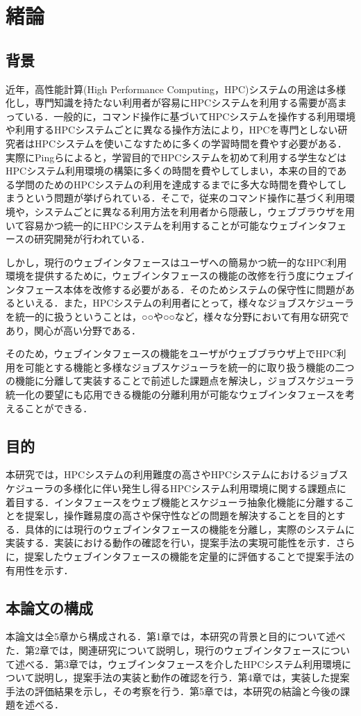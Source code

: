 
\section{緒論}
\subsection{背景}
近年，高性能計算(High Performance Computing，HPC)システムの用途は多様化し，専門知識を持たない利用者が容易にHPCシステムを利用する需要が高まっている．一般的に，コマンド操作に基づいてHPCシステムを操作する利用環境や利用するHPCシステムごとに異なる操作方法により，HPCを専門としない研究者はHPCシステムを使いこなすために多くの学習時間を費やす必要がある．実際にPingらによると，学習目的でHPCシステムを初めて利用する学生などはHPCシステム利用環境の構築に多くの時間を費やしてしまい，本来の目的である学問のためのHPCシステムの利用を達成するまでに多大な時間を費やしてしまうという問題が挙げられている．\cite{cite1}そこで，従来のコマンド操作に基づく利用環境や，システムごとに異なる利用方法を利用者から隠蔽し，ウェブブラウザを用いて容易かつ統一的にHPCシステムを利用することが可能なウェブインタフェースの研究開発が行われている．\par
しかし，現行のウェブインタフェースはユーザへの簡易かつ統一的なHPC利用環境を提供するために，ウェブインタフェースの機能の改修を行う度にウェブインタフェース本体を改修する必要がある．そのためシステムの保守性に問題があるといえる．また，HPCシステムの利用者にとって，様々なジョブスケジューラを統一的に扱うということは，○○や○○など，様々な分野において有用な研究であり，関心が高い分野である．\par
そのため，ウェブインタフェースの機能をユーザがウェブブラウザ上でHPC利用を可能とする機能と多様なジョブスケジューラを統一的に取り扱う機能の二つの機能に分離して実装することで前述した課題点を解決し，ジョブスケジューラ統一化の要望にも応用できる機能の分離利用が可能なウェブインタフェースを考えることができる．\par

\subsection{目的}
本研究では，HPCシステムの利用難度の高さやHPCシステムにおけるジョブスケジューラの多様化に伴い発生し得るHPCシステム利用環境に関する課題点に着目する．インタフェースをウェブ機能とスケジューラ抽象化機能に分離することを提案し，操作難易度の高さや保守性などの問題を解決することを目的とする．具体的には現行のウェブインタフェースの機能を分離し，実際のシステムに実装する．実装における動作の確認を行い，提案手法の実現可能性を示す．さらに，提案したウェブインタフェースの機能を定量的に評価することで提案手法の有用性を示す．\par

\subsection{本論文の構成}
本論文は全5章から構成される．第1章では，本研究の背景と目的について述べた．第2章では，関連研究について説明し，現行のウェブインタフェースについて述べる．第3章では，ウェブインタフェースを介したHPCシステム利用環境について説明し，提案手法の実装と動作の確認を行う．第4章では，実装した提案手法の評価結果を示し，その考察を行う．第5章では，本研究の結論と今後の課題を述べる．\par
